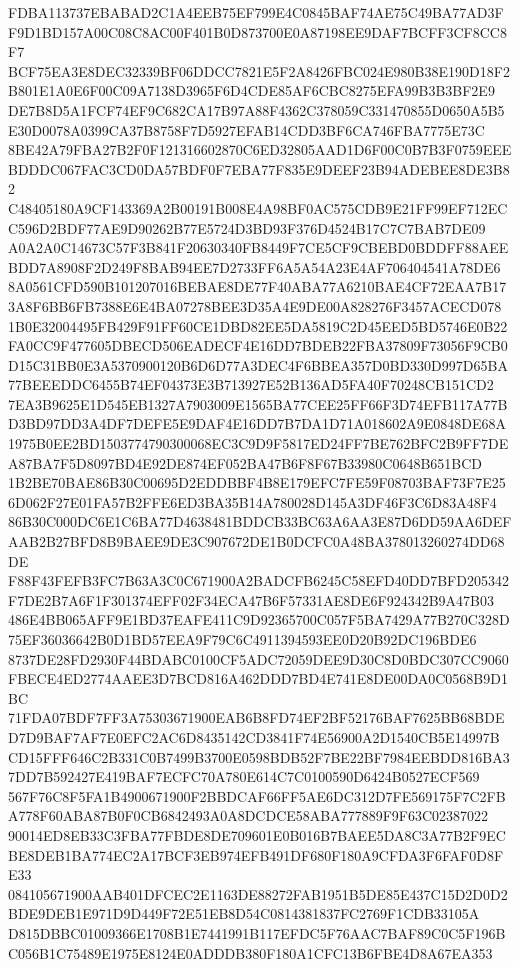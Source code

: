 \documentclass[UTF8,fontset=fandol,zihao=-4,a4paper]{ctexart}
\begin{document}
{{FDBA113737EBABAD2C1A4EEB75EF799E4C0845BAF74AE75C49BA77AD3FF9D1BD157A00C08C8AC00F401B0D873700E0A87198EE9DAF7BCFF3CF8CC8F7
BCF75EA3E8DEC32339BF06DDCC7821E5F2A8426FBC024E980B38E190D18F2B801E1A0E6F00C09A7138D3965F6D4CDE85AF6CBC8275EFA99B3B3BF2E9
DE7B8D5A1FCF74EF9C682CA17B97A88F4362C378059C331470855D0650A5B5E30D0078A0399CA37B8758F7D5927EFAB14CDD3BF6CA746FBA7775E73C
8BE42A79FBA27B2F0F121316602870C6ED32805AAD1D6F00C0B7B3F0759EEEBDDDC067FAC3CD0DA57BDF0F7EBA77F835E9DEEF23B94ADEBEE8DE3B82
C48405180A9CF143369A2B00191B008E4A98BF0AC575CDB9E21FF99EF712ECC596D2BDF77AE9D90262B77E5724D3BD93F376D4524B17C7C7BAB7DE09
A0A2A0C14673C57F3B841F20630340FB8449F7CE5CF9CBEBD0BDDFF88AEEBDD7A8908F2D249F8BAB94EE7D2733FF6A5A54A23E4AF706404541A78DE6
8A0561CFD590B101207016BEBAE8DE77F40ABA77A6210BAE4CF72EAA7B173A8F6BB6FB7388E6E4BA07278BEE3D35A4E9DE00A828276F3457ACECD078
1B0E32004495FB429F91FF60CE1DBD82EE5DA5819C2D45EED5BD5746E0B22FA0CC9F477605DBECD506EADECF4E16DD7BDEB22FBA37809F73056F9CB0
D15C31BB0E3A5370900120B6D6D77A3DEC4F6BBEA357D0BD330D997D65BA77BEEEDDC6455B74EF04373E3B713927E52B136AD5FA40F70248CB151CD2
7EA3B9625E1D545EB1327A7903009E1565BA77CEE25FF66F3D74EFB117A77BD3BD97DD3A4DF7DEFE5E9DAF4E16DD7B7DA1D71A018602A9E0848DE68A
1975B0EE2BD1503774790300068EC3C9D9F5817ED24FF7BE762BFC2B9FF7DEA87BA7F5D8097BD4E92DE874EF052BA47B6F8F67B33980C0648B651BCD
1B2BE70BAE86B30C00695D2EDDBBF4B8E179EFC7FE59F08703BAF73F7E256D062F27E01FA57B2FFE6ED3BA35B14A780028D145A3DF46F3C6D83A48F4
86B30C000DC6E1C6BA77D4638481BDDCB33BC63A6AA3E87D6DD59AA6DEFAAB2B27BFD8B9BAEE9DE3C907672DE1B0DCFC0A48BA378013260274DD68DE
F88F43FEFB3FC7B63A3C0C671900A2BADCFB6245C58EFD40DD7BFD205342F7DE2B7A6F1F301374EFF02F34ECA47B6F57331AE8DE6F924342B9A47B03
486E4BB065AFF9E1BD37EAFE411C9D92365700C057F5BA7429A77B270C328D75EF36036642B0D1BD57EEA9F79C6C4911394593EE0D20B92DC196BDE6
8737DE28FD2930F44BDABC0100CF5ADC72059DEE9D30C8D0BDC307CC9060FBECE4ED2774AAEE3D7BCD816A462DDD7BD4E741E8DE00DA0C0568B9D1BC
71FDA07BDF7FF3A75303671900EAB6B8FD74EF2BF52176BAF7625BB68BDED7D9BAF7AF7E0EFC2AC6D8435142CD3841F74E56900A2D1540CB5E14997B
CD15FFF646C2B331C0B7499B3700E0598BDB52F7BE22BF7984EEBDD816BA37DD7B592427E419BAF7ECFC70A780E614C7C0100590D6424B0527ECF569
567F76C8F5FA1B4900671900F2BBDCAF66FF5AE6DC312D7FE569175F7C2FBA778F60ABA87B0F0CB6842493A0A8DCDCE58ABA777889F9F63C02387022
90014ED8EB33C3FBA77FBDE8DE709601E0B016B7BAEE5DA8C3A77B2F9ECBE8DEB1BA774EC2A17BCF3EB974EFB491DF680F180A9CFDA3F6FAF0D8FE33
084105671900AAB401DFCEC2E1163DE88272FAB1951B5DE85E437C15D2D0D2BDE9DEB1E971D9D449F72E51EB8D54C0814381837FC2769F1CDB33105A
D815DBBC01009366E1708B1E7441991B117EFDC5F76AAC7BAF89C0C5F196BC056B1C75489E1975E8124E0ADDDB380F180A1CFC13B6FBE4D8A67EA353
}}
\end{document}
